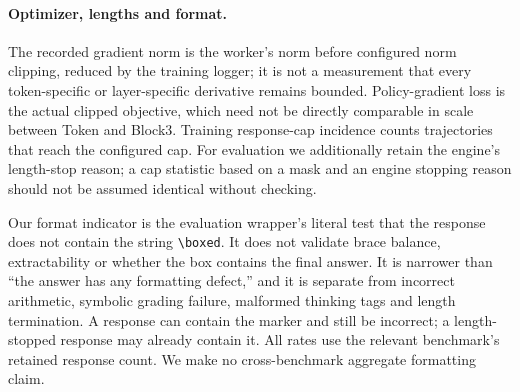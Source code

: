 \paragraph{Optimizer, lengths and format.}
The recorded gradient norm is the worker's norm before configured norm clipping, reduced by the training logger; it is not a measurement that every token-specific or layer-specific derivative remains bounded. Policy-gradient loss is the actual clipped objective, which need not be directly comparable in scale between Token and Block3. Training response-cap incidence counts trajectories that reach the configured cap. For evaluation we additionally retain the engine's length-stop reason; a cap statistic based on a mask and an engine stopping reason should not be assumed identical without checking.

Our format indicator is the evaluation wrapper's literal test that the response does not contain the string \verb|\boxed|. It does not validate brace balance, extractability or whether the box contains the final answer. It is narrower than ``the answer has any formatting defect,'' and it is separate from incorrect arithmetic, symbolic grading failure, malformed thinking tags and length termination. A response can contain the marker and still be incorrect; a length-stopped response may already contain it. All rates use the relevant benchmark's retained response count. We make no cross-benchmark aggregate formatting claim.
